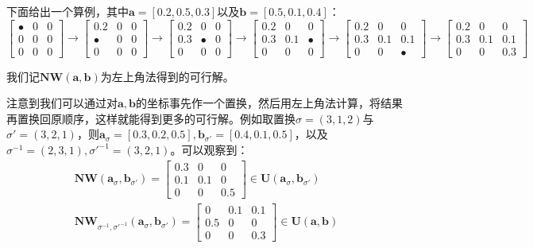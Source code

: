 \documentclass[cn,10pt,math=newtx,citestyle=gb7714-2015,bibstyle=gb7714-2015]{elegantbook}
\begin{document}
下面给出一个算例，其中$\mathbf{a}=[0.2,0.5,0.3]$以及$\mathbf{b}=[0.5,0.1,0.4]$：
\begin{equation*}
    \begin{bmatrix}
        \bullet & 0 & 0 \\
        0 & 0 & 0 \\
        0 & 0 & 0
    \end{bmatrix} \to 
    \begin{bmatrix}
        0.2 & 0 & 0 \\
        \bullet & 0 & 0 \\
        0 & 0 & 0
    \end{bmatrix} \to
    \begin{bmatrix}
        0.2 & 0 & 0 \\
        0.3 & \bullet & 0 \\
        0 & 0 & 0
    \end{bmatrix} \to
    \begin{bmatrix}
        0.2 & 0 & 0 \\
        0.3 & 0.1 & \bullet \\
        0 & 0 & 0
    \end{bmatrix} \to
        \begin{bmatrix}
        0.2 & 0 & 0 \\
        0.3 & 0.1 & 0.1 \\
        0 & 0 & \bullet
    \end{bmatrix} \to
    \begin{bmatrix}
        0.2 & 0 & 0 \\
        0.3 & 0.1 & 0.1 \\
        0 & 0 & 0.3
    \end{bmatrix}
\end{equation*}

我们记$\mathbf{NW(a,b)}$为左上角法得到的可行解。

注意到我们可以通过对$\mathbf{a,b}$的坐标事先作一个置换，然后用左上角法计算，将结果再置换回原顺序，这样就能得到更多的可行解。例如取置换$\sigma=(3,1,2)$与$\sigma'=(3,2,1)$，则$\mathbf{a}_\sigma=[0.3,0.2,0.5], \mathbf{b}_{\sigma'}=[0.4,0.1,0.5]$，以及$\sigma^{-1}=(2,3,1),\sigma'^{-1}=(3,2,1)$。可以观察到：
\begin{align*}
    \mathbf{NW}(\mathbf{a}_\sigma,\mathbf{b}_{\sigma'}) = \begin{bmatrix}
        0.3 & 0 & 0 \\
        0.1 & 0.1 & 0 \\
        0 & 0 & 0.5
    \end{bmatrix} \in \mathbf{U}(\mathbf{a}_\sigma,\mathbf{b}_{\sigma'})\\
    \mathbf{NW}_{\sigma^{-1},\sigma'^{-1} }(\mathbf{a}_\sigma,\mathbf{b}_{\sigma'}) = \begin{bmatrix}
        0 & 0.1 & 0.1 \\
        0.5 & 0 & 0 \\
        0 & 0 & 0.3
    \end{bmatrix} \in \mathbf{U}(\mathbf{a},\mathbf{b})
\end{align*}
\end{document}
